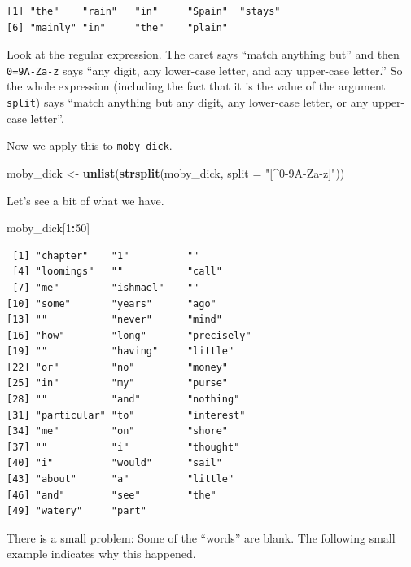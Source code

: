 \documentclass[
]{krantz}
\makeatletter
\newenvironment{Shaded}{\begin{snugshade}}{\end{snugshade}}
\newcommand{\DataTypeTok}[1]{\textcolor[rgb]{0.27,0.27,0.27}{#1}}
\newcommand{\DecValTok}[1]{\textcolor[rgb]{0.06,0.06,0.06}{#1}}
\newcommand{\KeywordTok}[1]{\textcolor[rgb]{0.27,0.27,0.27}{\textbf{#1}}}
\newcommand{\NormalTok}[1]{#1}
\newcommand{\OperatorTok}[1]{\textcolor[rgb]{0.43,0.43,0.43}{\textbf{#1}}}
\newcommand{\StringTok}[1]{\textcolor[rgb]{0.5,0.5,0.5}{#1}}
\newenvironment{kframe}{%
\medskip{}
\setlength{\fboxsep}{.8em}
 \def\at@end@of@kframe{}%
 \ifinner\ifhmode%
  \def\at@end@of@kframe{\end{minipage}}%
  \begin{minipage}{\columnwidth}%
 \fi\fi%
 \def\FrameCommand##1{\hskip\@totalleftmargin \hskip-\fboxsep
 \colorbox{shadecolor}{##1}\hskip-\fboxsep
     \hskip-\linewidth \hskip-\@totalleftmargin \hskip\columnwidth}%
 \MakeFramed {\advance\hsize-\width
   \@totalleftmargin\z@ \linewidth\hsize
   \@setminipage}}%
 {\par\unskip\endMakeFramed%
 \at@end@of@kframe}
\renewenvironment{Shaded}{\begin{kframe}}{\end{kframe}}
\makeatother
\begin{document}
\begin{verbatim}
[1] "the"    "rain"   "in"     "Spain"  "stays" 
[6] "mainly" "in"     "the"    "plain" 
\end{verbatim}

Look at the regular expression. The caret says ``match anything but'' and then \texttt{0=9A-Za-z} says ``any digit, any lower-case letter, and any upper-case letter.'' So the whole expression (including the fact that it is the value of the argument \texttt{split}) says ``match anything but any digit, any lower-case letter, or any upper-case letter''.

Now we apply this to \texttt{moby\_dick}.

\begin{Shaded}
\begin{Highlighting}[]
\NormalTok{moby\_dick \textless{}{-}}\StringTok{ }\KeywordTok{unlist}\NormalTok{(}\KeywordTok{strsplit}\NormalTok{(moby\_dick, }\DataTypeTok{split =} \StringTok{"[\^{}0{-}9A{-}Za{-}z]"}\NormalTok{))}
\end{Highlighting}
\end{Shaded}

Let's see a bit of what we have.

\begin{Shaded}
\begin{Highlighting}[]
\NormalTok{moby\_dick[}\DecValTok{1}\OperatorTok{:}\DecValTok{50}\NormalTok{]}
\end{Highlighting}
\end{Shaded}

\begin{verbatim}
 [1] "chapter"    "1"          ""          
 [4] "loomings"   ""           "call"      
 [7] "me"         "ishmael"    ""          
[10] "some"       "years"      "ago"       
[13] ""           "never"      "mind"      
[16] "how"        "long"       "precisely" 
[19] ""           "having"     "little"    
[22] "or"         "no"         "money"     
[25] "in"         "my"         "purse"     
[28] ""           "and"        "nothing"   
[31] "particular" "to"         "interest"  
[34] "me"         "on"         "shore"     
[37] ""           "i"          "thought"   
[40] "i"          "would"      "sail"      
[43] "about"      "a"          "little"    
[46] "and"        "see"        "the"       
[49] "watery"     "part"      
\end{verbatim}

There is a small problem: Some of the ``words'' are blank. The following small example indicates why this happened.
\end{document}
